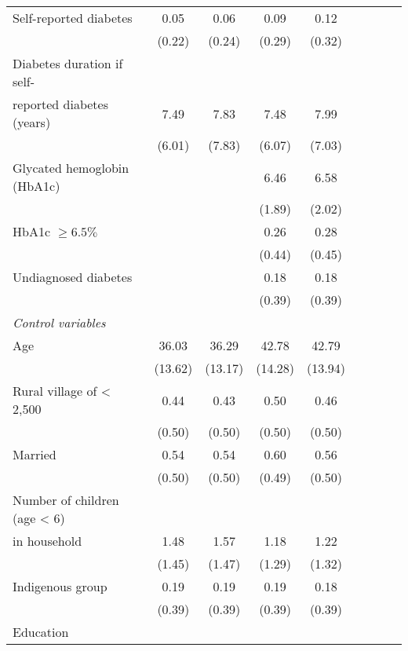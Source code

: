 \documentclass[10pt,letterpaper]{article}
\begin{document}
{\begin{table}[p]
\begin{adjustbox}{max width=0.7\linewidth, center}
\begin{threeparttable}
{\begin{tabular}{l*{4}{SS}}
						Self-reported diabetes  &         0.05&        0.06&        0.09&        0.12\\
						&      (0.22)&      (0.24)&      (0.29)&      (0.32)\\
						Diabetes duration if self- &&&&\\
						reported diabetes (years)   &        7.49&        7.83&        7.48&        7.99\\
						&      (6.01)&      (7.83)&      (6.07)&      (7.03)\\
						Glycated hemoglobin (HbA1c)&            &            &       6.46&        6.58\\
						&            &            &      (1.89)&      (2.02)\\
						HbA1c $\geq 6.5\%$  &            &            &        0.26&        0.28\\
						&            &            &      (0.44)&      (0.45)\\
						Undiagnosed diabetes&            &            &        0.18&        0.18\\
						&            &            &      (0.39)&      (0.39)\\
						\hspace*{10mm}\emph{Control variables} \\
						Age                 &       36.03&       36.29&       42.78&       42.79\\
						&     (13.62)&     (13.17)&     (14.28)&     (13.94)\\
						Rural village of < 2,500&        0.44&        0.43&        0.50&        0.46\\
						&      (0.50)&      (0.50)&      (0.50)&      (0.50)\\
						Married             &        0.54&        0.54&        0.60&        0.56\\
						&      (0.50)&      (0.50)&      (0.49)&      (0.50)\\
						Number of children (age < 6) &&&&\\
						in household&        1.48&        1.57&        1.18&        1.22\\
						&      (1.45)&      (1.47)&      (1.29)&      (1.32)\\
						Indigenous group    &        0.19&        0.19&        0.19&        0.18\\
						&      (0.39)&      (0.39)&      (0.39)&      (0.39)\\
						Education &&&& \\                    

\end{tabular}}
\end{threeparttable}
\end{adjustbox}
\end{table}}
\end{document}
